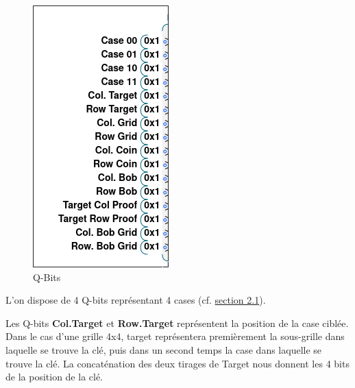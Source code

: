 \documentclass[12pt]{article}
\begin{document}
    \begin{figure}
        \begin{center}
            \includegraphics[width=0.8\linewidth]{image.png}
            \caption{Q-Bits}
            \label{fig:enter-label}
        \end{center}
    \end{figure}
    L'on dispose de 4 Q-bits représentant 4 cases (cf. \hyperref[sec:grid-2x2]{section 2.1}).
    \vspace{5mm}
    
    Les Q-bits \textbf{Col.Target} et \textbf{Row.Target} représentent la position de la case ciblée. Dans le cas d'une grille 4x4, target représentera premièrement la sous-grille dans laquelle se trouve la clé, puis dans un second temps la case dans laquelle se trouve la clé. La concaténation des deux tirages de Target nous donnent les 4 bits de la position de la clé.
    
\end{document}
